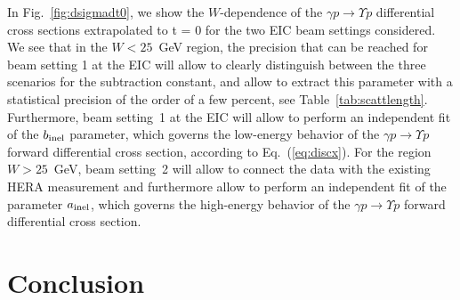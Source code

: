 \documentclass[prd,amsmath,twocolumn,floatfix,amssymb, preprintnumbers, linenumbers,nofootinbib, superscriptaddress]{revtex4}
\begin{document}
In Fig.~\ref{fig:dsigmadt0}, we show the $W$-dependence of the $\gamma p \to \Upsilon p$ differential cross sections extrapolated to t = 0 for the two EIC beam settings considered.  
We see that in the $W < 25$~GeV region, the precision that can be reached for beam setting 1 at the EIC will allow to clearly distinguish between the three scenarios for the subtraction constant, and allow to extract this parameter with a statistical precision of the order of a few percent, see Table~\ref{tab:scattlength}. Furthermore, beam setting~1 at the EIC will allow to perform an independent fit of the 
$b_{\rm inel}$ parameter, which governs the low-energy behavior of the $\gamma p \to \Upsilon p$ forward differential cross section, according to Eq.~(\ref{eq:discx}). 
For the region $W > 25$~GeV, beam setting~2 will allow to connect the data with the existing HERA measurement and furthermore allow to perform an independent fit of the parameter $a_{\rm inel}$, which governs the high-energy behavior of the $\gamma p \to \Upsilon p$ forward differential cross section.


\section{Conclusion}
\end{document}

